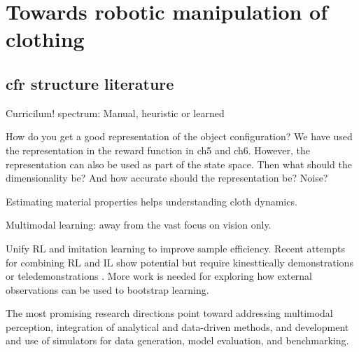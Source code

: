 \documentclass[\home/main.tex]{subfiles}
\begin{document}
\chapter{Towards robotic manipulation of clothing }\label{ch:towards_robotic_folding}
%   

\section{cfr structure literature}

Curricilum!  spectrum: Manual, heuristic or learned


How do you get a good representation of the object configuration?
    We have used the representation in the reward function in ch5 and ch6. However, the representation can also be used as part of the state space. Then what should the dimensionality be? And how accurate should the representation be? Noise? 

Estimating material properties helps understanding cloth dynamics. 

Multimodal learning: away from the vast focus on vision only. 

Unify RL and imitation learning to improve sample efficiency. Recent attempts for combining RL and IL show potential but require kinesttically demonstrations \autocite{vecerik2018leveraging} or teledemonstrations \autocite{Zhu-RSS-18}. More work is needed for exploring how external observations can be used to bootstrap learning. 


The most promising research directions point toward addressing multimodal perception, integration of analytical and data-driven methods, and development and use of simulators for data generation, model evaluation, and benchmarking.
\end{document}
